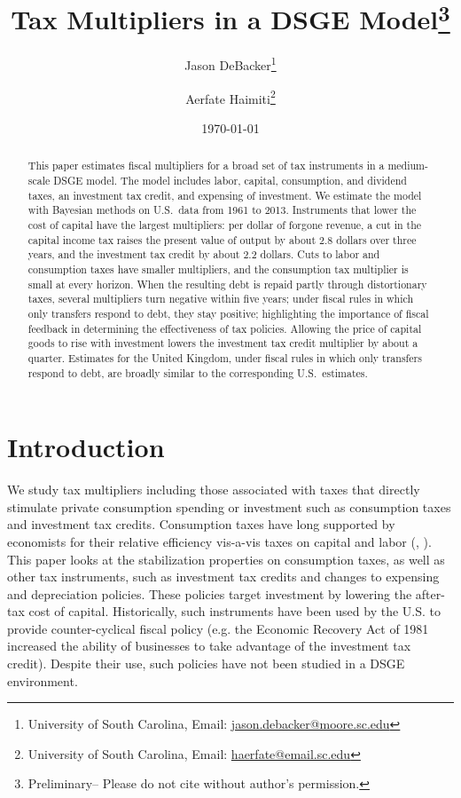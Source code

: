 \documentclass[article,11pt,letterpaper,fleqn]{article}
\author{
  Jason DeBacker\thanks{University of South Carolina, Email: \href{mailto:jason.debacker@moore.sc.edu}{jason.debacker@moore.sc.edu}}
  \and Aerfate Haimiti\thanks{University of South Carolina, Email: \href{mailto:haerfate@email.sc.edu}{haerfate@email.sc.edu}}
}
\title{Tax Multipliers in a DSGE Model\thanks{Preliminary-- Please do not cite without author's permission.}}
\date{\today}
\theoremstyle{definition}
\numberwithin{equation}{section}
\begin{document}

\maketitle


\begin{abstract}
This paper estimates fiscal multipliers for a broad set of tax instruments in a medium-scale DSGE model. The model includes labor, capital, consumption, and dividend taxes, an investment tax credit, and expensing of investment. We estimate the model with Bayesian methods on U.S.\ data from 1961 to 2013. Instruments that lower the cost of capital have the largest multipliers: per dollar of forgone revenue, a cut in the capital income tax raises the present value of output by about 2.8 dollars over three years, and the investment tax credit by about 2.2 dollars. Cuts to labor and consumption taxes have smaller multipliers, and the consumption tax multiplier is small at every horizon. When the resulting debt is repaid partly through distortionary taxes, several multipliers turn negative within five years; under fiscal rules in which only transfers respond to debt, they stay positive; highlighting the importance of fiscal feedback in determining the effectiveness of tax policies. Allowing the price of capital goods to rise with investment lowers the investment tax credit multiplier by about a quarter. Estimates for the United Kingdom, under fiscal rules in which only transfers respond to debt, are broadly similar to the corresponding U.S.\ estimates.
\end{abstract}


\section{Introduction}
\label{sec:intro}


We study tax multipliers including those associated with taxes that directly stimulate private consumption spending or investment such as consumption taxes and investment tax credits.  Consumption taxes have long supported by economists for their relative efficiency vis-a-vis taxes on capital and labor (\citep{Correia2010}, \citep{DS2023}).  This paper looks at the stabilization properties on consumption taxes, as well as other tax instruments, such as investment tax credits and changes to expensing and depreciation policies.  These policies target investment by lowering the after-tax cost of capital.  Historically, such instruments have been used by the U.S. to provide counter-cyclical fiscal policy (e.g. the Economic Recovery Act of 1981 increased the ability of businesses to take advantage of the investment tax credit).  Despite their use, such policies have not been studied in a DSGE environment.
\end{document}
